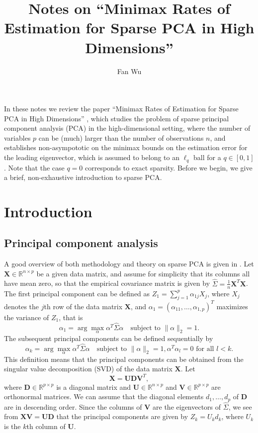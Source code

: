 \documentclass[11pt]{article}
\title{Notes on ``Minimax Rates of Estimation for Sparse PCA in High Dimensions''}
\author{Fan Wu}
\newcommand{\R}{\mathbb{R}}
\newcommand{\X}{\mathbf{X}}
\begin{document}
\maketitle
 
In these notes we review the paper ``Minimax Rates of Estimation for Sparse PCA in High Dimensions'' \citep{VL12}, which studies the problem of sparse principal component analysis (PCA) in the high-dimensional setting, where the number of variables $p$ can be (much) larger than the number of observations $n$, and establishes non-asympototic on the minimax bounds on the estimation error for the leading eigenvector, which is assumed to belong to an $\ell_q$ ball for a $q\in [0,1]$. Note that the case $q=0$ corresponds to exact sparsity. Before we begin, we give a brief, non-exhaustive introduction to sparse PCA.

\section{Introduction}
\subsection{Principal component analysis}
A good overview of both methodology and theory on sparse PCA is given in \citep{ZX18}. Let $\X\in \R^{n\times p}$ be a given data matrix, and assume for simplicity that its columns all have mean zero, so that the empirical covariance matrix is given by $\hat{\Sigma} = \frac{1}{n}\X^T\X$. The first principal component can be defined as $Z_1 = \sum_{j=1}^p\alpha_{1j}X_j$, where $X_j$ denotes the $j$th row of the data matrix $\X$, and $\alpha_1 = (\alpha_{11},\dots, \alpha_{1,p})^T$ maximizes the variance of $Z_1$, that is
\begin{equation}\label{eq:varmax_first}
\alpha_1 = \operatorname{arg}\max_\alpha\alpha^T\hat{\Sigma}\alpha \quad \text{subject to } \|\alpha\|_2=1.
\end{equation}
The subsequent principal components can be defined sequentially by
\begin{equation}\label{eq:varmax}
\alpha_k = \operatorname{arg}\max_\alpha\alpha^T\hat{\Sigma}\alpha \quad \text{subject to } \|\alpha\|_2=1, \alpha^T\alpha_l = 0 \text{ for all } l<k.
\end{equation}
This definition means that the principal components can be obtained from the singular value decomposition (SVD) of the data matrix $\X$. Let
\begin{equation*}
\X = \mathbf{UDV}^T,
\end{equation*}
where $\mathbf{D}\in \R^{p\times p}$ is a diagonal matrix and $\mathbf{U}\in \R^{n\times p}$ and $\mathbf{V}\in \R^{p\times p}$ are orthonormal matrices. We can assume that the diagonal elements $d_1,\dots,d_p$ of $\mathbf{D}$ are in descending order. Since the columns of $\mathbf{V}$ are the eigenvectors of $\hat{\Sigma}$, we see from $\X\mathbf{V} = \mathbf{UD}$ that the principal components are given by $Z_k = U_kd_k$, where $U_k$ is the $k$th column of $\mathbf{U}$.
\end{document}
